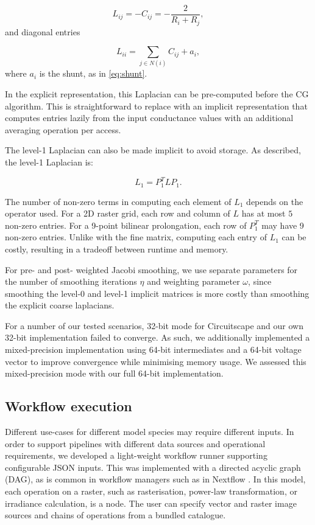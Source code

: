 \documentclass[11pt, a4paper]{article}
\begin{document}
\[
L_{ij}=-C_{ij}=-\frac{2}{R_i+R_j},
\]
and diagonal entries

\[
L_{ii} = \sum_{j\in N(i)} C_{ij} + a_i,
\]
where $a_i$ is the shunt, as in \ref{eq:shunt}.

In the explicit representation, this Laplacian can be pre-computed before the CG algorithm.
This is straightforward to replace with an implicit representation that computes
entries lazily from the input conductance values with an additional averaging operation
per access. 

The level-1 Laplacian can also be made implicit to avoid storage.
As described, the level-1 Laplacian is:

\begin{equation}
\label{eq:coarse1}
L_1 = P_1^T L P_1.
\end{equation}

The number of non-zero terms in computing each element of $L_1$ depends on the operator used. For a 2D raster grid,
each row and column of $L$ has at most $5$ non-zero entries. For a 9-point bilinear prolongation,
each row of $P_1^T$ may have 9 non-zero entries. 
Unlike with the fine matrix, computing each entry of $L_1$ can be costly, resulting in a tradeoff between
runtime and memory. 

For pre- and post- weighted Jacobi smoothing, we use separate parameters for the number of smoothing
iterations $\eta$ and weighting parameter $\omega$, since smoothing the level-0 and level-1 implicit
matrices is more costly than smoothing the explicit coarse laplacians.

For a number of our tested scenarios, 32-bit mode for Circuitscape and our own 32-bit implementation failed to converge. 
As such, we additionally implemented a mixed-precision implementation using 64-bit intermediates and a 64-bit voltage
vector to improve convergence while minimising memory usage. We assessed this mixed-precision mode with our
full 64-bit implementation.

\subsection{Workflow execution}

Different use-cases for different model species may require different inputs.
In order to support pipelines with different data sources and operational requirements,
we developed a light-weight workflow runner supporting configurable JSON inputs.
This was implemented with a directed acyclic graph (DAG),  
as is common in workflow managers such as in Nextflow \cite{di2017nextflow}.
In this model, each operation on a raster, such as rasterisation, power-law transformation,
or irradiance calculation, is a node.
The user can specify vector and raster image sources and chains of operations from a bundled catalogue.
\end{document}
